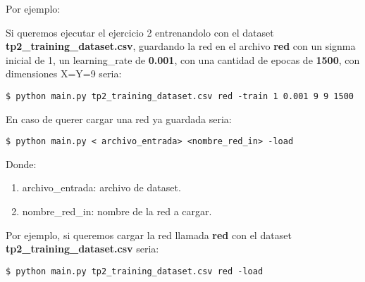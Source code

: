 Por ejemplo: 

Si queremos ejecutar el ejercicio 2 entrenandolo con el dataset \textbf{tp2\_training\_dataset.csv}, guardando la red en el archivo \textbf{red} con un signma inicial de 1, un learning\_rate de \textbf{0.001}, con una cantidad de epocas de \textbf{1500}, con dimensiones X=Y=9 seria:

\begin{verbatim}
$ python main.py tp2_training_dataset.csv red -train 1 0.001 9 9 1500
\end{verbatim}

En caso de querer cargar una red ya guardada seria:

\begin{verbatim}
$ python main.py < archivo_entrada> <nombre_red_in> -load 
\end{verbatim}

Donde:

\begin{enumerate}
\item archivo\_entrada: archivo de dataset.
\item nombre\_red\_in: nombre de la red a cargar.
\end{enumerate}

Por ejemplo, si queremos cargar la red llamada \textbf{red} con el dataset \textbf{tp2\_training\_dataset.csv} seria:

\begin{verbatim}
$ python main.py tp2_training_dataset.csv red -load
\end{verbatim}

